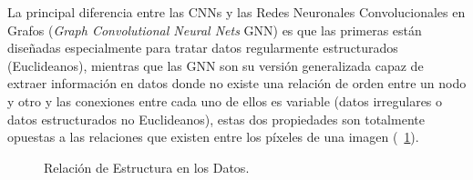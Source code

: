 	La principal diferencia entre las CNNs y las Redes Neuronales Convolucionales en Grafos (\textit{Graph Convolutional Neural Nets }GNN) es que las primeras están diseñadas especialmente para tratar datos regularmente estructurados (Euclideanos), mientras que las GNN son su versión generalizada capaz de extraer información en datos donde no existe una relación de orden entre un nodo y otro y las conexiones entre cada uno de ellos es variable (datos irregulares o datos estructurados no Euclideanos), estas dos propiedades son totalmente opuestas a las relaciones que existen entre los píxeles de una imagen (\figurename~\ref{euclidian-non}).
	
	\begin{figure}[!thb]
		\centering
		 \hspace{10mm}
		\caption[Relación de Estructura en los Datos]{Relación de Estructura en los Datos. \citep{Wu_2021}}
		\label{euclidian-non}
	\end{figure}
	
